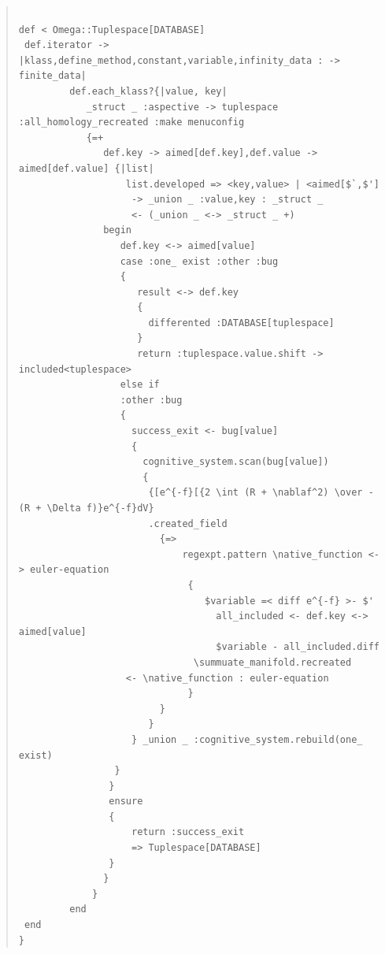 \documentclass{jsarticle}
\begin{document}
\begin{quote}
\setlength{\baselineskip}{12pt}
\begin{verbatim}

def < Omega::Tuplespace[DATABASE] 
 def.iterator -> |klass,define_method,constant,variable,infinity_data : -> finite_data|
         def.each_klass?{|value, key|
            _struct _ :aspective -> tuplespace :all_homology_recreated :make menuconfig
            {=+
               def.key -> aimed[def.key],def.value -> aimed[def.value] {|list|
                   list.developed => <key,value> | <aimed[$`,$']
                    -> _union _ :value,key : _struct _ 
                    <- (_union _ <-> _struct _ +)
               begin
                  def.key <-> aimed[value]
                  case :one_ exist :other :bug
                  {
                     result <-> def.key
                     {
                       differented :DATABASE[tuplespace]
                     }
                     return :tuplespace.value.shift -> included<tuplespace>
                  else if
                  :other :bug 
                  { 
                    success_exit <- bug[value]
                    {
                      cognitive_system.scan(bug[value])
                      {
                       {[e^{-f}[{2 \int (R + \nablaf^2) \over -(R + \Delta f)}e^{-f}dV}
				       .created_field
                         {=>
                             regexpt.pattern \native_function <-> euler-equation
                              {
                                 $variable =< diff e^{-f} >- $'
                                   all_included <- def.key <-> aimed[value]
                                   $variable - all_included.diff
                               \summuate_manifold.recreated 
			       <- \native_function : euler-equation
                              }
                         }
                       }
                    } _union _ :cognitive_system.rebuild(one_ exist)
                 }
                }
                ensure
                {
                    return :success_exit
                    => Tuplespace[DATABASE]
                }
               } 
             }
         end
 end
}

\end{verbatim}
\end{quote}
\end{document}
